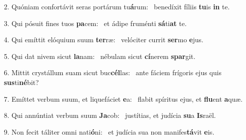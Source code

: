 2. Quóniam confortávit seras portárum tu\textbf{á}rum: \ast\  benedíxit fíliis \textbf{tu}is \textbf{in} te.\

3. Qui pósuit fines tuos \textbf{pa}cem: \ast\  et ádipe fruménti \textbf{sá}ti\textbf{at} te.\

4. Qui emíttit elóquium suum \textbf{ter}ræ: \ast\  velóciter currit \textbf{ser}mo \textbf{e}jus.\

5. Qui dat nivem sicut \textbf{la}nam: \ast\  nébulam sicut \textbf{cí}nerem \textbf{spar}git.\

6. Mittit crystállum suam sicut buc\textbf{cél}las: \ast\  ante fáciem frígoris ejus quis \textbf{sus}ti\textbf{né}bit?\

7. Emíttet verbum suum, et liquefáciet \textbf{e}a: \ast\  flabit spíritus ejus, et \textbf{flu}ent \textbf{a}quæ.\

8. Qui annúntiat verbum suum \textbf{Ja}cob: \ast\  justítias, et judícia \textbf{su}a \textbf{Is}raël.\

9. Non fecit táliter omni nati\textbf{ó}ni: \ast\  et judícia sua non manifes\textbf{tá}vit \textbf{e}is.\

